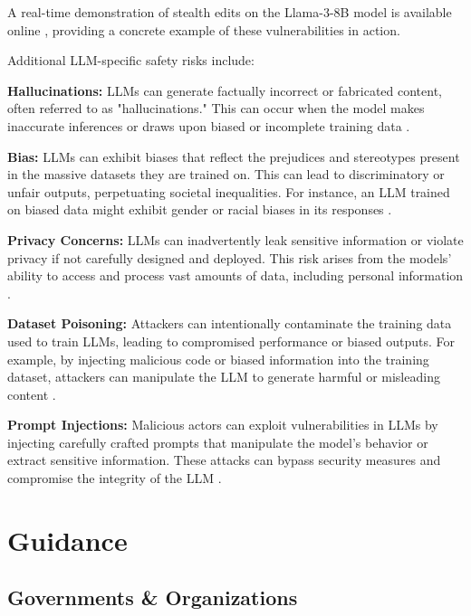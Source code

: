A real-time demonstration of stealth edits on the Llama-3-8B model is available online , providing a concrete example of these vulnerabilities in action.

Additional LLM-specific safety risks include:

\textbf{Hallucinations:} LLMs can generate factually incorrect or fabricated content, often referred to as "hallucinations." This can occur when the model makes inaccurate inferences or draws upon biased or incomplete training data .

\textbf{Bias:} LLMs can exhibit biases that reflect the prejudices and stereotypes present in the massive datasets they are trained on. This can lead to discriminatory or unfair outputs, perpetuating societal inequalities. For instance, an LLM trained on biased data might exhibit gender or racial biases in its responses .

\textbf{Privacy Concerns:} LLMs can inadvertently leak sensitive information or violate privacy if not carefully designed and deployed. This risk arises from the models' ability to access and process vast amounts of data, including personal information .  

\textbf{Dataset Poisoning:} Attackers can intentionally contaminate the training data used to train LLMs, leading to compromised performance or biased outputs. For example, by injecting malicious code or biased information into the training dataset, attackers can manipulate the LLM to generate harmful or misleading content .

\textbf{Prompt Injections:} Malicious actors can exploit vulnerabilities in LLMs by injecting carefully crafted prompts that manipulate the model's behavior or extract sensitive information. These attacks can bypass security measures and compromise the integrity of the LLM .

\section{Guidance}

\subsection{Governments \& Organizations}

